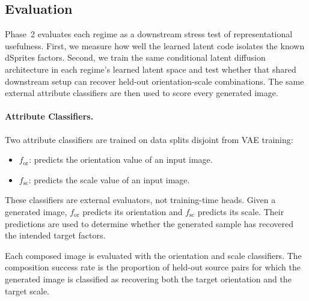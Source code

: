 \subsection{Evaluation}
\label{subsec:p2_eval}

Phase~2 evaluates each regime as a downstream stress test of representational usefulness. First, we
measure how well the learned latent code isolates the known dSprites factors. Second, we train the
same conditional latent diffusion architecture in each regime's learned latent space and test
whether that shared downstream setup can recover held-out orientation-scale combinations. The same
external attribute classifiers are then used to score every generated image.

\paragraph{Attribute Classifiers.}
Two attribute classifiers are trained on data splits disjoint from VAE training:
\begin{itemize}
    \item $f_{\mathrm{or}}$: predicts the orientation value of an input image.
    \item $f_{\mathrm{sc}}$: predicts the scale value of an input image.
\end{itemize}
These classifiers are external evaluators, not training-time heads. Given a generated image,
$f_{\mathrm{or}}$ predicts its orientation and $f_{\mathrm{sc}}$ predicts its scale. Their
predictions are used to determine whether the generated sample has recovered the intended target
factors.

Each composed image is evaluated with the orientation and scale classifiers. The composition success
rate is the proportion of held-out source pairs for which the generated image is classified as
recovering both the target orientation and the target scale.


